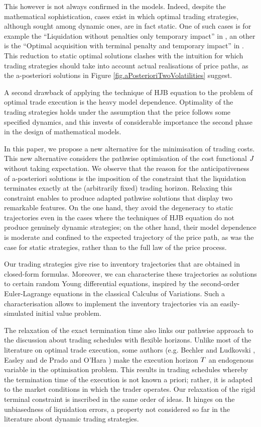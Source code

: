 \documentclass[10pt,a4paper]{article}
\begin{document}
	This however is not always confirmed in the models. Indeed, despite the mathematical sophistication, cases exist in which  optimal trading strategies, although sought among dynamic ones, are in fact static. One of such cases is for example the ``Liquidation without penalties only temporary impact'' in  \cite[Section 6.3]{CJP15alg}, an other is the ``Optimal acquisition with terminal penalty and temporary impact'' in  \cite[Section 6.4]{CJP15alg}. This reduction to static optimal solutions clashes with the intuition for which trading strategies should take into account actual realisations of price paths, as the a-posteriori solutions in Figure \ref{fig.aPosterioriTwoVolatilities} suggest. 
	
	A second drawback of applying  the technique of HJB equation to the problem of optimal trade execution is the heavy model dependence. Optimality of the trading strategies holds under the assumption that the price follows some specified dynamics, and this invests  of considerable importance the second phase in the design of mathematical models.  
	
	In this paper, we propose a new alternative for the minimisation of trading costs. This new alternative considers the pathwise optimisation of the cost functional $J$ without taking expectation. We observe that the reason for the anticipativeness of a-posteriori solutions is the imposition of the constraint that the liquidation terminates exactly at the (arbitrarily fixed) trading horizon. Relaxing this constraint enables to produce adapted pathwise solutions that display two remarkable features. On the one hand, they avoid the degeneracy to static trajectories even in the cases where the techniques of HJB equation do not produce genuinely dynamic strategies; on the other hand, their model dependence is moderate and confined to the expected trajectory of the price path, as was the case for static strategies, rather than to the full law of the price process.
	 
	Our trading strategies give rise to inventory trajectories that are obtained in closed-form formulas. Moreover, we can characterise these trajectories as solutions to certain random Young differential equations, inspired   by the second-order Euler-Lagrange equations in the classical Calculus of Variations. Such a characterisation allows to implement the inventory trajectories via an easily-simulated initial value problem.
	
	The relaxation of the exact termination time also links our pathwise approach to the discussion about trading schedules with flexible horizons. Unlike most of the literature on optimal trade execution, some authors (e.g. Bechler and Ludkovski \cite{BL15opt}, Easley and de Prado and O'Hara \cite{ED15opt})  make  the execution horizon  $T$ an  endogenous variable in the optimisation problem. This results in trading schedules whereby the termination time of the execution is not known a priori; rather, it is adapted to the market conditions in which the trader operates.  Our relaxation of the rigid terminal constraint is inscribed in the same order of ideas. It hinges on the unbiasedness of liquidation errors, a property not considered so far in the literature about dynamic trading strategies. 
	
\end{document}
